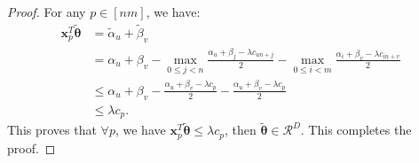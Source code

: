 \documentclass[11pt]{article}
\renewcommand{\vec}[1]{\bm{#1}}
\begin{document}
\begin{proof}
For any $p \in [nm]$, we have:
\begin{equation*}
\begin{split}
\vec{x}_p^T\tilde{\vec{\theta}} &= \tilde{{\alpha}}_{u} + \tilde{{\beta}}_v \\
&= {{\alpha}}_{u} + {{\beta}}_v - \max_{0\leq j< n} \frac{{{\alpha}}_u +{{\beta}}_j - \lambda {c}_{un+j}}{2} - \max_{0 \leq i < m} \frac{{{\alpha}}_i +{{\beta}}_v - \lambda {c}_{in+v}}{2}\\
&\leq{{\alpha}}_{u} + {{\beta}}_v - \frac{{{\alpha}}_u +{{\beta}}_v - \lambda {c}_{p}}{2} - \frac{{{\alpha}}_u +{{\beta}}_v - \lambda {c}_{p}}{2}\\
&\leq \lambda {c}_{p}.
\end{split}
\end{equation*}
This proves that $\forall p$, we have $\vec{x}_p^T\tilde{\vec{\theta}}\leq \lambda {c}_{p} $, then $\tilde{\vec{\theta}} \in \mathcal{R}^{D}$. This completes the proof.
\end{proof}
\end{document}

